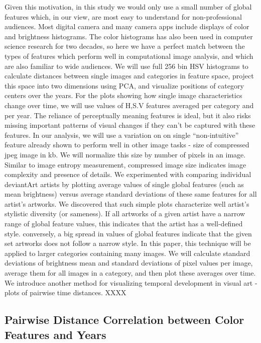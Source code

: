 \documentclass[letterpaper]{article}
\begin{document}
Given this motivation, in this study we would only use a small number of global features which, in our view, are most easy to understand for non-professional audiences. Most digital camera and many camera apps include displays of color and brightness histograms. The color histograms has also been used in computer science research for two decades, so here we have a perfect match between the types of features which perform well in computational image analysis, and which are also familiar to wide audiences. We will use full 256 bin HSV histograms to calculate distances between single images and categories in feature space, project this space into two dimensions using PCA, and visualize positions of category centers over the years. For the plots showing how single image characteristics change over time, we will use values of H,S.V features averaged per category and per year.
The reliance of perceptually meaning features is ideal, but it also risks missing important patterns of visual changes if they can’t be captured with these features. In our analysis, we will use a variation on on single “non-intuitive”  feature already shown to perform well in other image tasks - size of compressed jpeg image in kb. We will normalize this size by number of pixels in an image. Similar to image entropy measurement, compressed image size indicates image complexity and presence of details. 
We experimented with comparing individual deviantArt artists by plotting average values of single global features (such as mean brightness) versus average standard deviations of these same features for all artist’s artworks. We discovered that such simple plots characterize well artist’s stylistic diversity (or sameness). If all artworks of a given artist have a narrow range of global feature values, this indicates that the artist has a well-defined style. conversely, a big spread in values of global features indicate that the given set artworks does not follow a narrow style. In this paper, this technique will be applied to larger categories containing many images. We will calculate standard deviations of brightness mean and standard deviations of pixel values per image, average them for all images in a category, and then plot these averages over time. 
We introduce another method for visualizing temporal development in visual art - plots of pairwise time distances. XXXX


\subsection{Pairwise Distance Correlation between Color Features and Years}
\end{document}
